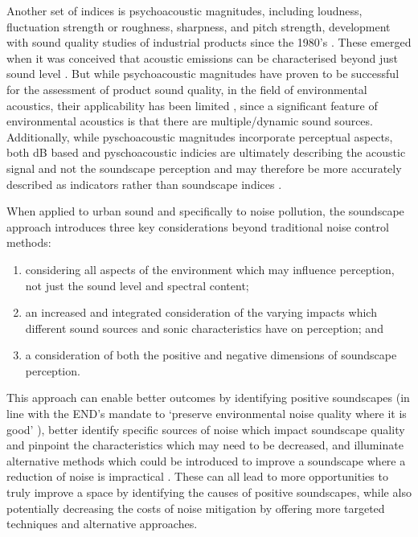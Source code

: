 \documentclass[
  authoryear,
  preprint,
  3p]{elsarticle}
\providecommand{\tightlist}{%
  \setlength{\itemsep}{0pt}\setlength{\parskip}{0pt}}\usepackage{longtable,booktabs,array}
\begin{document}
Another set of indices is psychoacoustic magnitudes, including loudness,
fluctuation strength or roughness, sharpness, and pitch strength,
development with sound quality studies of industrial products since the
1980's \citep{Zwicker2007Psychoacoustics}. These emerged when it was
conceived that acoustic emissions can be characterised beyond just sound
level \citep{Blauert1997Sound}. But while psychoacoustic magnitudes have
proven to be successful for the assessment of product sound quality, in
the field of environmental acoustics, their applicability has been
limited \citep{Fastl2006Psychoacoustic}, since a significant feature of
environmental acoustics is that there are multiple/dynamic sound
sources. Additionally, while pyschoacoustic magnitudes incorporate
perceptual aspects, both dB based and pyschoacoustic indicies are
ultimately describing the acoustic signal and not the soundscape
perception and may therefore be more accurately described as indicators
rather than soundscape indices \citep{Mitchell2023conceptual}.

When applied to urban sound and specifically to noise pollution, the
soundscape approach introduces three key considerations beyond
traditional noise control methods:

\begin{enumerate}
\def\labelenumi{\arabic{enumi}.}
\tightlist
\item
  considering all aspects of the environment which may influence
  perception, not just the sound level and spectral content;
\item
  an increased and integrated consideration of the varying impacts which
  different sound sources and sonic characteristics have on perception;
  and
\item
  a consideration of both the positive and negative dimensions of
  soundscape perception.
\end{enumerate}

This approach can enable better outcomes by identifying positive
soundscapes (in line with the END's mandate to `preserve environmental
noise quality where it is good' \citep{EuropeanUnion2002Directive}),
better identify specific sources of noise which impact soundscape
quality and pinpoint the characteristics which may need to be decreased,
and illuminate alternative methods which could be introduced to improve
a soundscape where a reduction of noise is impractical
\citep{Fiebig2018Does, Kang2018Impact}. These can all lead to more
opportunities to truly improve a space by identifying the causes of
positive soundscapes, while also potentially decreasing the costs of
noise mitigation by offering more targeted techniques and alternative
approaches.
\end{document}
